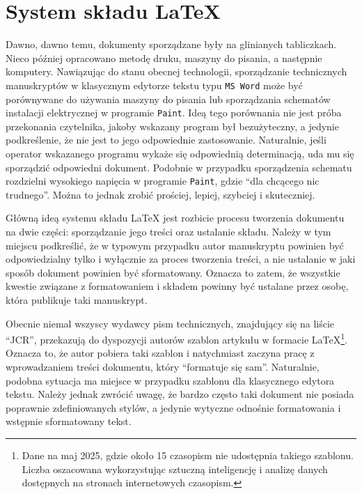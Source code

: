 \chapter{System składu \LaTeX}

Dawno, dawno temu, dokumenty sporządzane były na glinianych tabliczkach. Nieco później opracowano metodę druku, maszyny do pisania, a następnie komputery. Nawiązując do stanu obecnej technologii, sporządzanie technicznych manuskryptów w klasycznym edytorze tekstu typu \texttt{MS Word} może być porównywane do używania maszyny do pisania lub sporządzania schematów instalacji elektrycznej w programie \texttt{Paint}. Ideą tego porównania nie jest próba przekonania czytelnika, jakoby wskazany program był bezużyteczny, a jedynie podkreślenie, że nie jest to jego odpowiednie zastosowanie. Naturalnie, jeśli operator wskazanego programu wykaże się odpowiednią determinacją, uda mu się sporządzić odpowiedni dokument. Podobnie w przypadku sporządzenia schematu rozdzielni wysokiego napięcia w programie \texttt{Paint}, gdzie \enquote{dla chcącego nic trudnego}. Można to jednak zrobić prościej, lepiej, szybciej i skuteczniej.

Główną ideą systemu składu \LaTeX{} jest rozbicie procesu tworzenia dokumentu na dwie części: sporządzanie jego treści oraz ustalanie składu. Należy w tym miejscu podkreślić, że w typowym przypadku autor manuskryptu powinien być odpowiedzialny tylko i wyłącznie za proces tworzenia treści, a nie ustalanie w jaki sposób dokument powinien być sformatowany. Oznacza to zatem, że wszystkie kwestie związane z formatowaniem i składem powinny być ustalane przez osobę, która publikuje taki manuskrypt.

Obecnie niemal wszyscy wydawcy pism technicznych, znajdujący się na liście \enquote{JCR}, przekazują do dyspozycji autorów szablon artykułu w formacie \LaTeX\footnote{Dane na maj 2025, gdzie około 15 czasopism nie udostępnia takiego szablonu. Liczba oszacowana wykorzystując sztuczną inteligencję i analizę danych dostępnych na stronach internetowych czasopism.}. Oznacza to, że autor pobiera taki szablon i natychmiast zaczyna pracę z wprowadzaniem treści dokumentu, który \enquote{formatuje się sam}. Naturalnie, podobna sytuacja ma miejsce w przypadku szablonu dla klasycznego edytora tekstu. Należy jednak zwrócić uwagę, że bardzo często taki dokument nie posiada poprawnie zdefiniowanych stylów, a jedynie wytyczne odnośnie formatowania i wstępnie sformatowany tekst.

